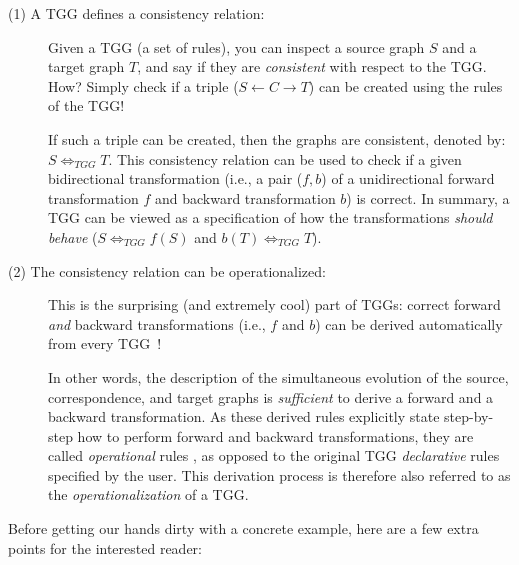\begin{description}

\item[(1) A TGG defines a consistency relation:]%
Given a TGG (a set of rul\-es), you can inspect a source graph $S$ and a target graph $T$, and say if they are \emph{consistent} with respect to the TGG. 
How? Simply check if a triple ($S\leftarrow C\rightarrow T$) can be created using the rules of the TGG!

\vspace{0.25cm}

If such a triple can be created, then the graphs are consistent, denoted by: $S \Leftrightarrow_{TGG} T$. This consistency relation can be used to check if a given bidirectional transformation (i.e., a pair ($f,b$) of a unidirectional forward transformation $f$ and backward transformation $b$) is correct. 
In summary, a TGG can be viewed as a specification of how the transformations \emph{should behave} ($S \Leftrightarrow_{TGG} f(S)$ and $b(T) \Leftrightarrow_{TGG} T$).
	
\item[(2) The consistency relation can be operationalized:]%
This is the surprising (and extremely cool) part of TGGs:
correct forward \emph{and} backward transformations (i.e., $f$ and $b$) can be derived automatically from every TGG~\cite{Giese2010,Hermann2011a}! 

\vspace{0.25cm}

In other words, the description of the simultaneous evolution of the source, correspondence, and target graphs is \emph{sufficient} to derive a forward and a backward transformation. 
As these derived rules explicitly state step-by-step how to perform forward and backward transformations, they are called \emph{operational} rules , as opposed to the original TGG \emph{declarative} rules specified by the user. 
This derivation process is therefore also referred to as the \emph{operationalization} of a TGG.
	
\end{description}

Before getting our hands dirty with a concrete example, here are a few extra points for the interested reader:  

